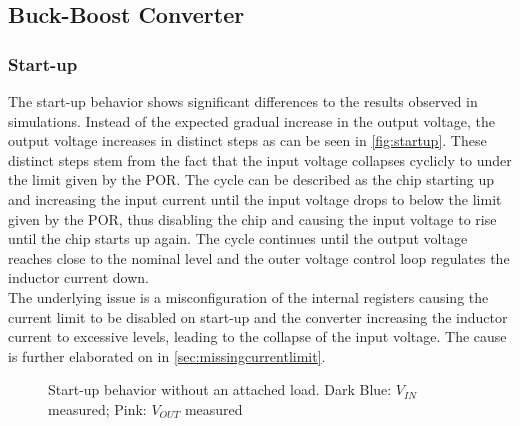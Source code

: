 \clearpage


\subsection{Buck-Boost Converter}

\subsubsection{Start-up}
\label{sec:startup}
The start-up behavior shows significant differences to the results observed in simulations. Instead of the expected gradual increase in the output voltage, the output voltage increases in distinct steps as can be seen in \autoref{fig:startup}. These distinct steps stem from the fact that the input voltage collapses cyclicly to under the limit given by the \ac{POR}. The cycle can be described as the chip starting up and increasing the input current until the input voltage drops to below the limit given by the \ac{POR}, thus disabling the chip and causing the input voltage to rise until the chip starts up again. The cycle continues until the output voltage reaches close to the nominal level and the outer voltage control loop regulates the inductor current down. \\
The underlying issue is a misconfiguration of the internal registers causing the current limit to be disabled on start-up and the converter increasing the inductor current to excessive levels, leading to the collapse of the input voltage. The cause is further elaborated on in \autoref{sec:missingcurrentlimit}.

\begin{figure}[ht]
	\centering
	
	\caption{Start-up behavior without an attached load. Dark Blue: $V_{IN}$ measured; Pink: $V_{OUT}$ measured}
	\label{fig:startup}
\end{figure}
\clearpage


